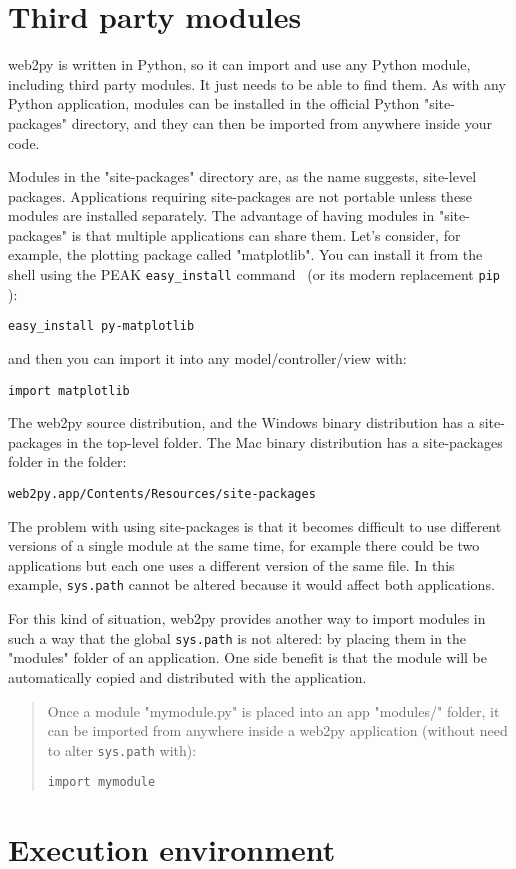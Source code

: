 \documentclass[justified,sixbynine,notoc]{tufte-book}
\def\ft{\small\tt}
\def\inxx#1{\index{#1}}
\begin{document}
\begin{fullwidth}
\goodbreak\section{Third party modules}

\inxx{import}
\noindent web2py is written in Python, so it can import and use any Python module, including third party modules. It just needs to be able to find them. As with any Python application, modules can be installed in the official Python "site-packages" directory, and they can then be imported from anywhere inside your code.

Modules in the "site-packages" directory are, as the name suggests, site-level packages. Applications requiring site-packages are not portable unless these modules are installed separately. The advantage of having modules in "site-packages" is that multiple applications can share them. Let's consider, for example, the plotting package called "matplotlib". You can install it from the shell using the PEAK {\ft easy\_install} command~\cite{easy-install} (or its modern replacement {\ft pip}~\cite{PIP} ):
\begin{lstlisting}
easy_install py-matplotlib
\end{lstlisting}
\noindent and then you can import it into any model/controller/view with:
\begin{lstlisting}
import matplotlib
\end{lstlisting}

The web2py source distribution, and the Windows binary distribution has a site-packages in the top-level folder. The Mac binary distribution has a site-packages folder in the folder:

{\ft web2py.app/Contents/Resources/site-packages}

The problem with using site-packages is that it becomes difficult to use different versions of a single module at the same time, for example there could be two applications but each one uses a different version of the same file.  In this example, {\ft sys.path} cannot be altered because it would affect both applications.

For this kind of situation, web2py provides another way to import modules in such a way that the global {\ft sys.path} is not altered: by placing them in the "modules" folder of an application. One side benefit is that the module will be automatically copied and distributed with the application.

\begin{quote}Once a module "mymodule.py" is placed into an app "modules/" folder, it can be imported from anywhere inside a web2py application (without need to alter {\ft sys.path} with):
\begin{lstlisting}
import mymodule
\end{lstlisting}\end{quote}
\goodbreak\section{Execution environment}


\end{fullwidth}
\end{document}
